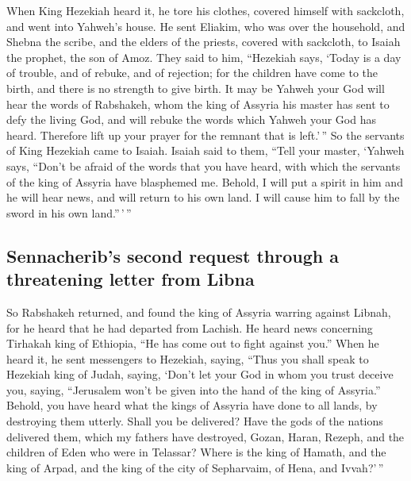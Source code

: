  When King Hezekiah heard it, he tore his clothes, covered
himself with sackcloth, and went into Yahweh's house.  He
sent Eliakim, who was over the household, and Shebna the scribe, and the
elders of the priests, covered with sackcloth, to Isaiah the prophet,
the son of Amoz.  They said to him, ``Hezekiah says,
`Today is a day of trouble, and of rebuke, and of rejection; for the
children have come to the birth, and there is no strength to give birth.
 It may be Yahweh your God will hear the words of
Rabshakeh, whom the king of Assyria his master has sent to defy the
living God, and will rebuke the words which Yahweh your God has heard.
Therefore lift up your prayer for the remnant that is left.'\,''
 So the servants of King Hezekiah came to Isaiah.
 Isaiah said to them, ``Tell your master, `Yahweh says,
``Don't be afraid of the words that you have heard, with which the
servants of the king of Assyria have blasphemed me. 
Behold, I will put a spirit in him and he will hear news, and will
return to his own land. I will cause him to fall by the sword in his own
land.''\,'\,''

\hypertarget{sennacheribs-second-request-through-a-threatening-letter-from-libna}{%
\subsection{Sennacherib's second request through a threatening letter
from
Libna}\label{sennacheribs-second-request-through-a-threatening-letter-from-libna}}

 So Rabshakeh returned, and found the king of Assyria
warring against Libnah, for he heard that he had departed from Lachish.
 He heard news concerning Tirhakah king of Ethiopia, ``He
has come out to fight against you.'' When he heard it, he sent
messengers to Hezekiah, saying,  ``Thus you shall speak
to Hezekiah king of Judah, saying, `Don't let your God in whom you trust
deceive you, saying, ``Jerusalem won't be given into the hand of the
king of Assyria.''  Behold, you have heard what the kings
of Assyria have done to all lands, by destroying them utterly. Shall you
be delivered?  Have the gods of the nations delivered
them, which my fathers have destroyed, Gozan, Haran, Rezeph, and the
children of Eden who were in Telassar?  Where is the king
of Hamath, and the king of Arpad, and the king of the city of
Sepharvaim, of Hena, and Ivvah?'\,''

